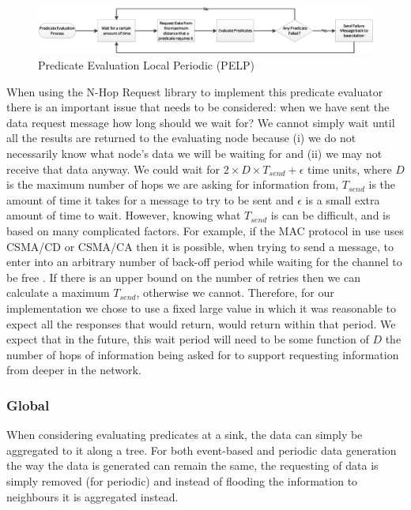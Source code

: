 \begin{figure}[H]
\centering
\includegraphics[width=\linewidth]{Diagrams/pelp.eps}
\caption{Predicate Evaluation Local Periodic (PELP)}
\end{figure}

When using the N-Hop Request library to implement this predicate evaluator there is an important issue that needs to be considered: when we have sent the data request message how long should we wait for? We cannot simply wait until all the results are returned to the evaluating node because (i) we do not necessarily know what node's data we will be waiting for and (ii) we may not receive that data anyway. We could wait for $2 \times D \times T_{send} + \epsilon$ time units, where $D$ is the maximum number of hops we are asking for information from, $T_{send}$ is the amount of time it takes for a message to try to be sent and $\epsilon$ is a small extra amount of time to wait. However, knowing what $T_{send}$ is can be difficult, and is based on many complicated factors. For example, if the MAC protocol in use uses CSMA/CD or CSMA/CA then it is possible, when trying to send a message, to enter into an arbitrary number of back-off period while waiting for the channel to be free \cite[p.~296]{Tanenbaum:2002:CN:572404}. If there is an upper bound on the number of retries then we can calculate a maximum $T_{send}$, otherwise we cannot. Therefore, for our implementation we chose to use a fixed large value in which it was reasonable to expect all the responses that would return, would return within that period. We expect that in the future, this wait period will need to be some function of $D$ the number of hops of information being asked for to support requesting information from deeper in the network.


\subsubsection{Global}

When considering evaluating predicates at a sink, the data can simply be aggregated to it along a tree. For both event-based and periodic data generation the way the data is generated can remain the same, the requesting of data is simply removed (for periodic) and instead of flooding the information to neighbours it is aggregated instead.

